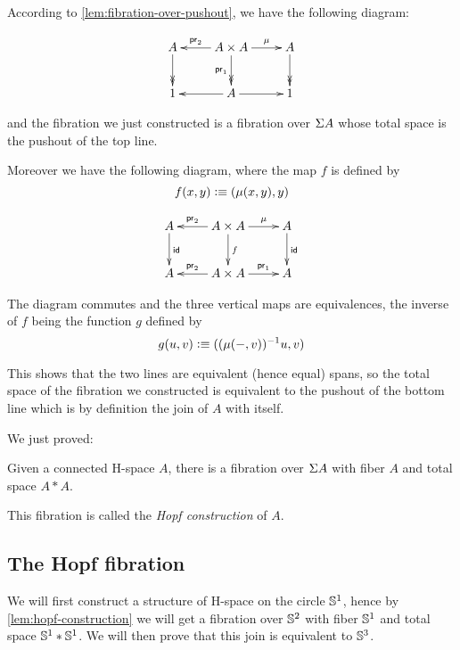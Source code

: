 According to \autoref{lem:fibration-over-pushout}, we have the following
diagram:

\[\xymatrix{A \ar@{->>}[d] & A \times A \ar[l]_-{\proj2} \ar@{->>}_{\proj1}[d]
  \ar[r]^-{\mu} & A \ar@{->>}[d] \\
  1 & A \ar[r] \ar[l] & 1}\]

and the fibration we just constructed is a fibration over $\Sigma A$ whose total
space is the pushout of the top line.

Moreover we have the following diagram, where the map $f$ is defined by
\[f(x,y)\vcentcolon\equiv(\mu(x,y),y)\]

\[\xymatrix{A \ar^\idfunc[d] & A \times A \ar[l]_-{\proj2} \ar^f[d]
  \ar[r]^-{\mu} & A \ar^\idfunc[d] \\
  A & A\times A \ar_-{\proj2}[l] \ar^-{\proj1}[r] & A}\]

The diagram commutes and the three vertical maps are equivalences, the inverse
of $f$ being the function $g$ defined by
\[g(u,v)\vcentcolon\equiv((\mu(-,v))^{-1}u,v)\]

This shows that the two lines are equivalent (hence equal) spans, so the total
space of the fibration we constructed is equivalent to the pushout of the bottom
line which is by definition the join of $A$ with itself.

We just proved:

\begin{lem}\label{lem:hopf-construction}
  Given a connected H-space $A$, there is a fibration over $\Sigma A$ with fiber
  $A$ and total space $A*A$.
\end{lem}

This fibration is called the \emph{Hopf construction} of $A$.

\subsection{The Hopf fibration}

We will first construct a structure of H-space on the circle $\mathbb{S}^1$, hence by
\autoref{lem:hopf-construction} we will get a fibration over $\mathbb{S}^2$ with fiber
$\mathbb{S}^1$ and total space $\mathbb{S}^1*\mathbb{S}^1$. We will then prove that this join is
equivalent to $\mathbb{S}^3$.

